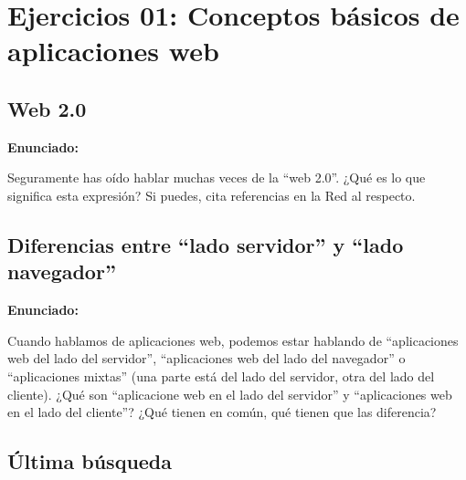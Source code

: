 \newpage


\section{Ejercicios 01: Conceptos básicos de aplicaciones web}

\subsection{Web 2.0}
\label{subsec:web-20}

\textbf{Enunciado:}

Seguramente has oído hablar muchas veces de la ``web 2.0''. ¿Qué es lo que significa esta expresión? Si puedes, cita referencias en la Red al respecto.

\subsection{Diferencias entre ``lado servidor'' y ``lado navegador''}
\label{subsec:appweb-servidor-navegador}

\textbf{Enunciado:}

Cuando hablamos de aplicaciones web, podemos estar hablando de ``aplicaciones web del lado del servidor'', ``aplicaciones web del lado del navegador'' o ``aplicaciones mixtas'' (una parte está del lado del servidor, otra del lado del cliente). ¿Qué son ``aplicacione web en el lado del servidor'' y ``aplicaciones web en el lado del cliente''? ¿Qué tienen en común, qué tienen que las diferencia? 

\subsection{Última búsqueda}
\label{subsec:ultima-busqueda}

